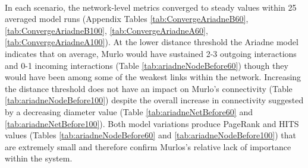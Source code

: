 \documentclass[12pt,a4paper]{thesis}
\begin{document}
\paragraph{}
In each scenario, the network-level metrics converged to steady values within 25 averaged model runs (Appendix Tables \ref{tab:ConvergeAriadneB60}, \ref{tab:ConvergeAriadneB100}, \ref{tab:ConvergeAriadneA60}, \ref{tab:ConvergeAriadneA100}). At the lower distance threshold the Ariadne model indicates that on average, Murlo would have sustained 2-3 outgoing interactions and 0-1 incoming interactions (Table \ref{tab:ariadneNodeBefore60}) though they would have been among some of the weakest links within the network. Increasing the distance threshold does not have an impact on Murlo's connectivity (Table \ref{tab:ariadneNodeBefore100}) despite the overall increase in connectivity suggested by a decreasing diameter value (Table \ref{tab:ariadneNetBefore60} and \ref{tab:ariadneNetBefore100}). Both model variations produce PageRank and HITS values (Tables \ref{tab:ariadneNodeBefore60} and \ref{tab:ariadneNodeBefore100}) that are extremely small and therefore confirm Murlos's relative lack of importance within the system.   
\end{document}
